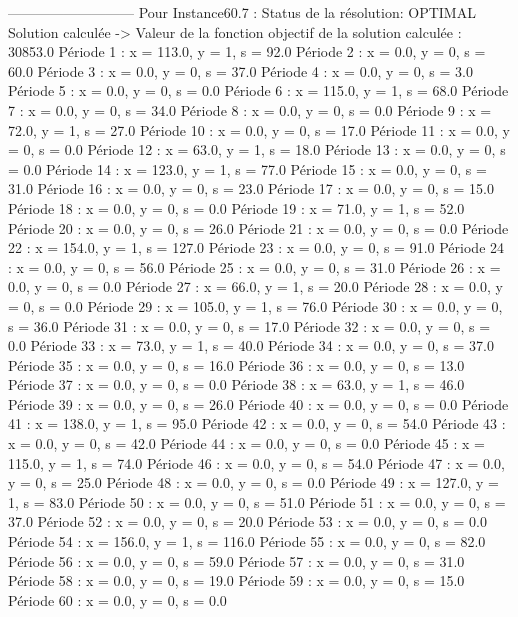 ---------------------------
Pour Instance60.7  :
Status de la résolution: OPTIMAL
Solution calculée
-> Valeur de la fonction objectif de la solution calculée :  30853.0
Période 1 : x = 113.0, y = 1, s = 92.0
Période 2 : x = 0.0, y = 0, s = 60.0
Période 3 : x = 0.0, y = 0, s = 37.0
Période 4 : x = 0.0, y = 0, s = 3.0
Période 5 : x = 0.0, y = 0, s = 0.0
Période 6 : x = 115.0, y = 1, s = 68.0
Période 7 : x = 0.0, y = 0, s = 34.0
Période 8 : x = 0.0, y = 0, s = 0.0
Période 9 : x = 72.0, y = 1, s = 27.0
Période 10 : x = 0.0, y = 0, s = 17.0
Période 11 : x = 0.0, y = 0, s = 0.0
Période 12 : x = 63.0, y = 1, s = 18.0
Période 13 : x = 0.0, y = 0, s = 0.0
Période 14 : x = 123.0, y = 1, s = 77.0
Période 15 : x = 0.0, y = 0, s = 31.0
Période 16 : x = 0.0, y = 0, s = 23.0
Période 17 : x = 0.0, y = 0, s = 15.0
Période 18 : x = 0.0, y = 0, s = 0.0
Période 19 : x = 71.0, y = 1, s = 52.0
Période 20 : x = 0.0, y = 0, s = 26.0
Période 21 : x = 0.0, y = 0, s = 0.0
Période 22 : x = 154.0, y = 1, s = 127.0
Période 23 : x = 0.0, y = 0, s = 91.0
Période 24 : x = 0.0, y = 0, s = 56.0
Période 25 : x = 0.0, y = 0, s = 31.0
Période 26 : x = 0.0, y = 0, s = 0.0
Période 27 : x = 66.0, y = 1, s = 20.0
Période 28 : x = 0.0, y = 0, s = 0.0
Période 29 : x = 105.0, y = 1, s = 76.0
Période 30 : x = 0.0, y = 0, s = 36.0
Période 31 : x = 0.0, y = 0, s = 17.0
Période 32 : x = 0.0, y = 0, s = 0.0
Période 33 : x = 73.0, y = 1, s = 40.0
Période 34 : x = 0.0, y = 0, s = 37.0
Période 35 : x = 0.0, y = 0, s = 16.0
Période 36 : x = 0.0, y = 0, s = 13.0
Période 37 : x = 0.0, y = 0, s = 0.0
Période 38 : x = 63.0, y = 1, s = 46.0
Période 39 : x = 0.0, y = 0, s = 26.0
Période 40 : x = 0.0, y = 0, s = 0.0
Période 41 : x = 138.0, y = 1, s = 95.0
Période 42 : x = 0.0, y = 0, s = 54.0
Période 43 : x = 0.0, y = 0, s = 42.0
Période 44 : x = 0.0, y = 0, s = 0.0
Période 45 : x = 115.0, y = 1, s = 74.0
Période 46 : x = 0.0, y = 0, s = 54.0
Période 47 : x = 0.0, y = 0, s = 25.0
Période 48 : x = 0.0, y = 0, s = 0.0
Période 49 : x = 127.0, y = 1, s = 83.0
Période 50 : x = 0.0, y = 0, s = 51.0
Période 51 : x = 0.0, y = 0, s = 37.0
Période 52 : x = 0.0, y = 0, s = 20.0
Période 53 : x = 0.0, y = 0, s = 0.0
Période 54 : x = 156.0, y = 1, s = 116.0
Période 55 : x = 0.0, y = 0, s = 82.0
Période 56 : x = 0.0, y = 0, s = 59.0
Période 57 : x = 0.0, y = 0, s = 31.0
Période 58 : x = 0.0, y = 0, s = 19.0
Période 59 : x = 0.0, y = 0, s = 15.0
Période 60 : x = 0.0, y = 0, s = 0.0


